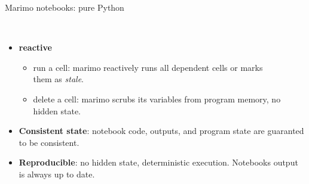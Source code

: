 \documentclass[11pt, serif, mathserif, compress]{beamer}  %
\begin{document}
\begin{frame}{Marimo notebooks: pure Python}

  \begin {bclogo}[noborder=true, couleur=gray!20, couleurBarre=Chocolate, logo=\raisebox{1mm}{\,\huge😇}, marge=0, margeG=-0.5, margeD=-0.7]
    {\ }\smallskip

    \begin{itemize}\setlength\itemsep{3mm}
      
    \item {\bf reactive}
      
      \begin{itemize}\setlength\itemsep{1mm}  

      \item<2-> run a cell: marimo reactively runs all dependent cells or marks\\
      \phantom{run a cell:} them as {\em stale}.
      
      \item<3-> delete a cell: marimo scrubs its variables from program memory,
      \phantom{run a cell:} no hidden state.
      
      \end{itemize}

    \item<4-> {\bf Consistent state}: notebook code, outputs, and program state are guaranted to be consistent.
    \medskip
      
    \item<5-> {\bf Reproducible}: no hidden state, deterministic execution. Notebooks output is always up to date.
      
    \end{itemize}
  \end{bclogo}

\end{frame}
\end{document}

